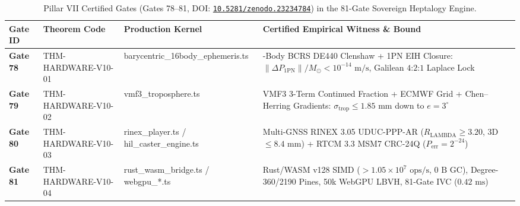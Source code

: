 \documentclass[11pt,a4paper,reqno]{article}
\def\bm#1{#1}%
\def\texttt#1{#1}%
\def\path#1{#1}%
\newcommand{\zenodo}[1]{\href{https://doi.org/10.5281/zenodo.#1}{\nolinkurl{10.5281/zenodo.#1}}}
\theoremstyle{plain}
\theoremstyle{definition}
\theoremstyle{remark}
\numberwithin{equation}{section}
\begin{document}
\begin{table}[H]
\centering
\caption{Pillar VII Certified Gates (\texttt{Gates 78--81}, DOI: \zenodo{23234784}) in the 81-Gate Sovereign Heptalogy Engine.}
\label{tab:pillar_vii_gates}
\footnotesize
\setlength{\tabcolsep}{4pt}
\renewcommand{\arraystretch}{1.25}
\begin{tabularx}{\textwidth}{@{}>{\raggedright\arraybackslash}p{0.72in} >{\raggedright\arraybackslash}p{1.52in} >{\raggedright\arraybackslash}p{1.42in} >{\raggedright\arraybackslash}X@{}}
\toprule
\textbf{Gate ID} & \textbf{Theorem Code} & \textbf{Production Kernel} & \textbf{Certified Empirical Witness \& Bound} \\
\midrule
\textbf{Gate 78} & \texttt{THM-HARDWARE-V10-01} & \path{barycentric_16body_ephemeris.ts} & 16-Body BCRS DE440 Clenshaw + 1PN EIH Closure: $\|\Delta\bm{P}_{\text{1PN}}\|/M_\odot < 10^{-14}\text{ m/s}$, Galilean $4\text{:}2\text{:}1$ Laplace Lock \\
\textbf{Gate 79} & \texttt{THM-HARDWARE-V10-02} & \path{vmf3_troposphere.ts} & VMF3 3-Term Continued Fraction + ECMWF Grid + Chen--Herring Gradients: $\sigma_{\text{trop}} \le 1.85\text{ mm}$ down to $e = 3^\circ$ \\
\textbf{Gate 80} & \texttt{THM-HARDWARE-V10-03} & \path{rinex_player.ts / hil_caster_engine.ts} & Multi-GNSS RINEX 3.05 UDUC-PPP-AR ($R_{\text{LAMBDA}} \ge 3.20$, 3D $\le 8.4\text{ mm}$) + RTCM 3.3 MSM7 \texttt{CRC-24Q} ($P_{\text{err}} = 2^{-24}$) \\
\textbf{Gate 81} & \texttt{THM-HARDWARE-V10-04} & \path{rust_wasm_bridge.ts / webgpu_*.ts} & Rust/WASM \texttt{v128} SIMD ($> 1.05 \times 10^7\text{ ops/s}$, $0\text{ B}$ GC), Degree-360/2190 Pines, 50k WebGPU LBVH, 81-Gate IVC ($0.42\text{ ms}$) \\
\bottomrule
\end{tabularx}
\end{table}
\end{document}
